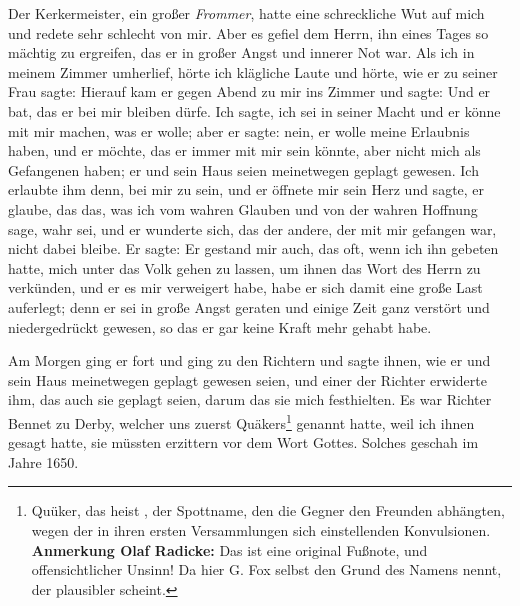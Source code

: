 Der Kerkermeister, ein großer \textit{Frommer}, hatte eine 
schreckliche Wut auf mich und redete sehr schlecht von mir. Aber es
gefiel dem Herrn, ihn eines Tages so mächtig zu ergreifen, das
er in großer Angst und innerer Not war. Als ich in meinem
Zimmer umherlief, hörte ich klägliche Laute und hörte, wie er zu
seiner Frau sagte:  Hierauf kam er gegen Abend zu mir
ins Zimmer und sagte:  Und er bat,
das er bei mir bleiben dürfe. Ich sagte, ich sei in seiner Macht
und er könne mit mir machen, was er wolle; aber er sagte:
nein, er wolle meine Erlaubnis haben, und er möchte, das er
immer mit mir sein könnte, aber nicht mich als Gefangenen haben;
er und sein Haus seien meinetwegen geplagt gewesen. Ich erlaubte
ihm denn, bei mir zu sein, und er öffnete mir sein Herz und
sagte, er glaube, das das, was ich vom wahren Glauben und
von der wahren Hoffnung sage, wahr sei, und er wunderte sich,
das der andere, der mit mir gefangen war, nicht dabei bleibe.
Er sagte: 
Er gestand mir auch, das oft, wenn ich ihn gebeten hatte, mich
unter das Volk gehen zu lassen, um ihnen das Wort des Herrn
zu verkünden, und er es mir verweigert habe, habe er sich damit
eine große Last auferlegt; denn er sei in große Angst geraten
und einige Zeit ganz verstört und niedergedrückt gewesen, so das
er gar keine Kraft mehr gehabt habe. 

Am Morgen ging er fort
und ging zu den Richtern und sagte ihnen, wie er und sein Haus
meinetwegen geplagt gewesen seien, und einer der Richter erwiderte
ihm, das auch sie geplagt seien, darum das sie mich festhielten.
Es war Richter Bennet zu Derby, 
welcher uns zuerst 
Quäkers\footnote{Quüker, 
das heist , der Spottname, den die Gegner den
Freunden abhängten, wegen der in ihren ersten Versammlungen 
sich einstellenden Konvulsionen. \textbf{Anmerkung Olaf Radicke:} Das 
ist eine original Fußnote, und offensichtlicher Unsinn! Da hier
G. Fox selbst den Grund des Namens nennt, der plausibler scheint.}
genannt hatte, weil ich ihnen gesagt hatte, sie müssten erzittern
vor dem Wort Gottes. Solches geschah im Jahre 1650.

